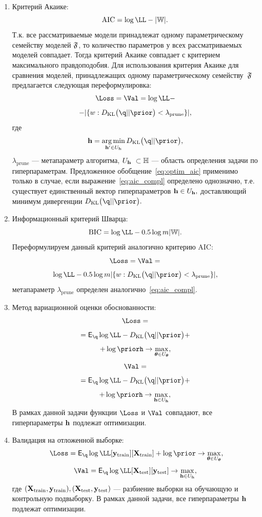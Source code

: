 \begin{enumerate}
\item Критерий Акаике:
\[
   \text{AIC} =  \log \LL - |\Wb|.
\]
Т.к. все рассматриваемые модели принадлежат одному параметрическому семейству моделей $\mathfrak{F}$, то количество параметров у всех рассматриваемых моделей  совпадает. Тогда критерий Акаике совпадает с критерием максимального правдоподобия. Для использования критерия Акаике для сравнения моделей, принадлежащих одному параметрическому семейству~$\mathfrak{F}$ предлагается следующая переформулировка:
\begin{equation}
\label{eq:optim_aic}
    \Loss = \Val = \log \LL - 
\end{equation}
\[
 - |\{w: \KL{\q}{\prior}<\lambda_\text{prune}\}|,
\]
где 
\begin{equation}\label{eq:aic_compl}\h=\argmin_{\h' \in \Uh} \KL{\q}{\prior},\end{equation} $\lambda_{\text{prune}}$ --- метапараметр алгоритма, $\Uh  \subset \Hb$ --- область определения задачи по гиперпараметрам. Предложенное обобщение~\eqref{eq:optim_aic} применимо только в случае, если выражение~\eqref{eq:aic_compl} определено однозначно, т.е. существует единственный вектор гиперпараметров  $\mathbf{h} \in U_{\mathbf{h}},$ доставляющий минимум дивергенции $\KL{\q}{\prior}.$

\item Информационный критерий Шварца:
\[
    \text{BIC} = \log \LL -0.5\log m|\Wb|.
\]
Переформулируем данный критерий аналогично критерию AIC:
\begin{equation}
\label{eq:optim_bic}
    \Loss = \Val =  
\end{equation}
\[
\log \LL - 0.5 \log m |\{w: \KL{\q}{\prior}<\lambda_{\text{prune}}\}|,
\]
метапараметр $\lambda_{\text{prune}}$ определен аналогично~\eqref{eq:aic_compl}.

\item Метод вариационной оценки обоснованности:
\begin{equation}
\label{eq:optim_elbo_method}   
    \Loss = 
\end{equation}
\[
= \E_{\q} \log \LL - \KL{\q}{\prior} + 
\]
\[
+\log\priorh \to \max_{\teta \in \Uteta},
\]
\[
     \Val = 
\]
\[
= \E_{\q} \log \LL - \KL{\q}{\prior} +
\]
\[+ \log\priorh \to \max_{\h \in \Uh},
\]
В рамках данной задачи функции $\Loss$ и $\Val$ совпадают, все гиперпараметры $\mathbf{h}$ подлежат оптимизации.

\item Валидация на отложенной выборке:
\begin{equation}
\label{eq:optim_hold_out}
    \Loss = \E_{\q} \log \LL[\y_\text{train}][\X_\text{train}] + \log \prior \to \max_{\teta \in \Uteta},
\end{equation}
\[
    \Val = \E_{\q} \log \LL[\X_\text{test}][\y_\text{test}] \to \max_{\h \in \Uh},
\]
где $(\mathbf{X}_\text{train}, \mathbf{y}_\text{train}), (\mathbf{X}_\text{test}, \mathbf{y}_\text{test})$ --- разбиение выборки на обучающую и контрольную подвыборку.
В рамках данной задачи, все гиперпараметры $\mathbf{h}$ подлежат оптимизации.

\end{enumerate}


